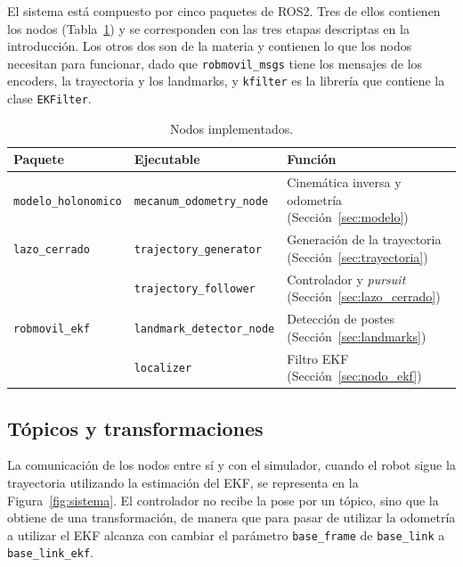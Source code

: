 \documentclass[11pt,a4paper]{article}
\begin{document}
El sistema está compuesto por cinco paquetes de ROS2. Tres de ellos contienen los nodos (Tabla~\ref{tab:nodos}) y se corresponden con las tres etapas descriptas en la introducción. Los otros dos son de la materia y contienen lo que los nodos necesitan para funcionar, dado que \texttt{robmovil\_msgs} tiene los mensajes de los encoders, la trayectoria y los landmarks, y \texttt{kfilter} es la librería que contiene la clase \texttt{EKFilter}.

\begin{table}[htbp]
\centering
\small
\begin{tabular}{lll}
\toprule
\textbf{Paquete} & \textbf{Ejecutable} & \textbf{Función} \\
\midrule
\texttt{modelo\_holonomico} & \texttt{mecanum\_odometry\_node} & Cinemática inversa y odometría (Sección~\ref{sec:modelo}) \\
\texttt{lazo\_cerrado} & \texttt{trajectory\_generator} & Generación de la trayectoria (Sección~\ref{sec:trayectoria}) \\
 & \texttt{trajectory\_follower} & Controlador y \emph{pursuit} (Sección~\ref{sec:lazo_cerrado}) \\
\texttt{robmovil\_ekf} & \texttt{landmark\_detector\_node} & Detección de postes (Sección~\ref{sec:landmarks}) \\
 & \texttt{localizer} & Filtro EKF (Sección~\ref{sec:nodo_ekf}) \\
\bottomrule
\end{tabular}
\caption{Nodos implementados.}
\label{tab:nodos}
\end{table}

\subsection{Tópicos y transformaciones}

La comunicación de los nodos entre sí y con el simulador, cuando el robot sigue la trayectoria utilizando la estimación del EKF, se representa en la Figura~\ref{fig:sistema}. El controlador no recibe la pose por un tópico, sino que la obtiene de una transformación, de manera que para pasar de utilizar la odometría a utilizar el EKF alcanza con cambiar el parámetro \texttt{base\_frame} de \texttt{base\_link} a \texttt{base\_link\_ekf}.
\end{document}
